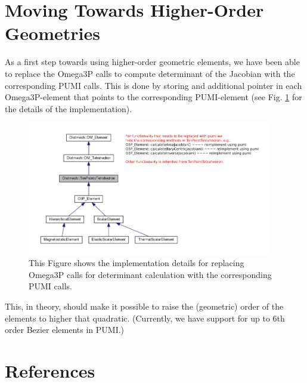 \documentclass[review,12pt]{elsarticle_summary_report}
\begin{document}
\section{\label{high_order_geom}Moving Towards Higher-Order Geometries}
As a first step towards using higher-order geometric elements, we have been able to replace the Omega3P calls to compute determinant of the Jacobian with the corresponding PUMI calls. This is done by storing and additional pointer in each Omega3P-element that points to the corresponding  PUMI-element (see Fig. \ref{imp} for the details of the implementation).
\begin{figure}[ph!]
\centering
\includegraphics[width=0.95\textwidth]{hide_ten_point_tet.png}
\caption{\label{imp} This Figure shows the implementation details for replacing Omega3P calls for determinant calculation with the corresponding PUMI calls.}
\end{figure}
This, in theory, should make it possible to raise the (geometric) order of the elements to higher that quadratic. (Currently, we have support for up to 6th order Bezier elements in PUMI.)

\clearpage
\newpage

\section*{References}
% 


\end{document}
